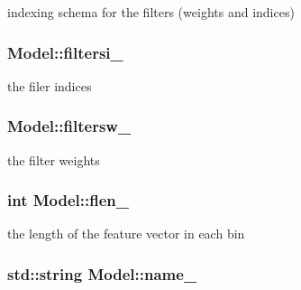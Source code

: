 indexing schema for the filters (weights and indices) 

\hypertarget{classModel_ab3f13d90cc96c70d4b454db12528f85f}{
\subsubsection[{filtersi\-\_\-}]{ {\bf \-Model\-::filtersi\-\_\-}}}\label{classModel_ab3f13d90cc96c70d4b454db12528f85f}


the filer indices 

\hypertarget{classModel_ac8594fac5ef6d874cf0a4f2fd856914d}{
\subsubsection[{filtersw\-\_\-}]{ {\bf \-Model\-::filtersw\-\_\-}}}\label{classModel_ac8594fac5ef6d874cf0a4f2fd856914d}


the filter weights 

\hypertarget{classModel_afafec86aa7175a4664ae76d545f084ea}{
\subsubsection[{flen\-\_\-}]{\setlength{\rightskip}{0pt plus 5cm}int {\bf \-Model\-::flen\-\_\-}}}\label{classModel_afafec86aa7175a4664ae76d545f084ea}


the length of the feature vector in each bin 

\hypertarget{classModel_afca3bde5ad33e936c455d3d311b8406d}{
\subsubsection[{name\-\_\-}]{\setlength{\rightskip}{0pt plus 5cm}std\-::string {\bf \-Model\-::name\-\_\-}}}\label{classModel_afca3bde5ad33e936c455d3d311b8406d}


